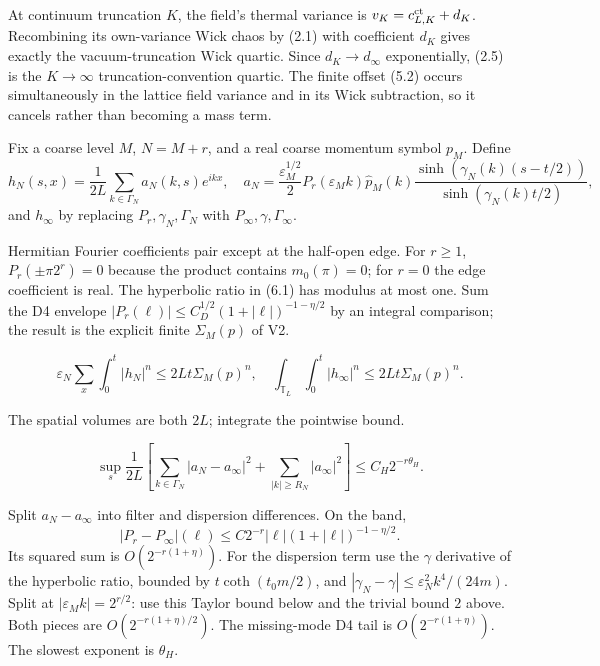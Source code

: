 \documentclass[11pt,a4paper]{article}
\newcommand{\eps}{\varepsilon}
\newcommand{\T}{\mathbb T}
\begin{document}
\Because At continuum truncation $K$, the field's thermal variance is
$v_K=c^{\rm ct}_{L,K}+d_K$.  Recombining its own-variance Wick chaos by (2.1)
with coefficient $d_K$ gives exactly the vacuum-truncation Wick quartic.  Since
$d_K\to d_\infty$ exponentially, (2.5) is the $K\to\infty$ truncation-convention
quartic.  The finite offset (5.2) occurs simultaneously in the lattice field variance
and in its Wick subtraction, so it cancels rather than becoming a mass term.

\QedStep


Fix a coarse level $M$, $N=M+r$, and a real coarse momentum symbol $p_M$.  Define
\[
 h_N(s,x)=\frac1{2L}\sum_{k\in\Gamma_N}a_N(k,s)e^{ikx},\quad
 a_N=\frac{\eps_M^{1/2}}2P_r(\eps_Mk)\widehat p_M(k)
 \frac{\sinh(\gamma_N(k)(s-t/2))}{\sinh(\gamma_N(k)t/2)},\tag{6.1}
\]
and $h_\infty$ by replacing $P_r,\gamma_N,\Gamma_N$ with
$P_\infty,\gamma,\Gamma_\infty$.


\Because Hermitian Fourier coefficients pair except at the half-open edge.  For
$r\ge1$, $P_r(\pm\pi2^r)=0$ because the product contains $m_0(\pi)=0$; for $r=0$
the edge coefficient is real.  The hyperbolic ratio in (6.1) has modulus at most one.
Sum the D4 envelope
$|P_r(\ell)|\le C_D^{1/2}(1+|\ell|)^{-1-\eta/2}$ by an integral comparison; the
result is the explicit finite $\Sigma_M(p)$ of V2.

\[
 \eps_N\sum_x\int_0^t|h_N|^n\le2Lt\Sigma_M(p)^n,
\quad
 \int_{\T_L}\int_0^t|h_\infty|^n\le2Lt\Sigma_M(p)^n.
\tag{6.2}
\]

\Because The spatial volumes are both $2L$; integrate the pointwise bound.

\[
 \sup_s\frac1{2L}\left[
 \sum_{k\in\Gamma_N}|a_N-a_\infty|^2+
 \sum_{|k|\ge R_N}|a_\infty|^2\right]
 \le C_H2^{-r\theta_H}.\tag{6.3}
\]

\Because Split $a_N-a_\infty$ into filter and dispersion differences.  On the band,
\[
 |P_r-P_\infty|(\ell)\le C2^{-r}|\ell|(1+|\ell|)^{-1-\eta/2}.
\]
Its squared sum is $O(2^{-r(1+\eta)})$.  For the dispersion term use the
$\gamma$ derivative of the hyperbolic ratio, bounded by
$t\coth(t_0m/2)$, and
$|\gamma_N-\gamma|\le\eps_N^2k^4/(24m)$.  Split at
$|\eps_Mk|=2^{r/2}$: use this Taylor bound below and the trivial bound $2$ above.
Both pieces are $O(2^{-r(1+\eta)/2})$.  The missing-mode D4 tail is
$O(2^{-r(1+\eta)})$.  The slowest exponent is $\theta_H$.
\end{document}
